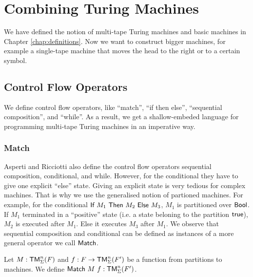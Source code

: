 \chapter{Combining Turing Machines}
\label{chap:combining}

We have defined the notion of multi-tape Turing machines and basic machines in Chapter \ref{chap:definitions}.  Now we want to construct bigger
machines, for example a single-tape machine that moves the head to the right or to a certain symbol.

\section{Control Flow Operators}
\label{sec:control}

We define control flow operators, like ``match'', ``if then else'', ``sequential composition'', and ``while''.
As a result, we get a shallow-embeded language for programming multi-tape Turing machines in an imperative way.

\subsection{Match}
\label{sec:match}

Asperti and Ricciotti \cite{asperti2015} also define the control flow operators sequential composition, conditional, and while.  However, for the
conditional they have to give one explicit ``else'' state.  Giving an explicit state is very tedious for complex machines.  That is why we use the
generalised notion of partioned machines.  For example, for the conditional $\textsf{If}~M_1~\textsf{Then}~M_2~\textsf{Else}~M_3$, $M_1$ is partitioned over $\textsf{Bool}$.  If $M_1$
terminated in a ``positive'' state (i.e. a state beloning to the partition $\textsf{true}$), $M_2$ is executed after $M_1$.  Else it executes $M_3$ after
$M_1$.  We observe that sequential composition and conditional can be defined as instances of a more general operator we call $\textsf{Match}$.

Let $M : \textsf{TM}_\Sigma^n(F)$ and $f : F \rightarrow \textsf{TM}_\Sigma^n(F')$ be a function from partitions to machines.  We define
$\textsf{Match}~M~f : \textsf{TM}_\Sigma^n(F')$.

